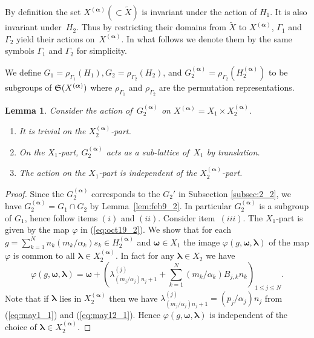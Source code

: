 \documentclass[11pt]{article}
\newtheorem{lemma}{Lemma}
\newcommand\bom{\boldsymbol{\omega}}
\newcommand\bol{\boldsymbol{\lambda}}
\newcommand\boa{\boldsymbol{\alpha}}
\begin{document}
By def\/inition the set $X^{(\boa)} (\subset \tilde{X})$ is invariant under the action of $H_1$.
It is also invariant under~$H_2$.
Thus by restricting their domains from $\tilde{X}$ to $X^{(\boa)}$, $\varGamma_1$ and $\varGamma_2$
yield their actions on~$X^{(\boa)}$.
In what follows we denote them by the same symbols $\varGamma_1$ and $\varGamma_2$
for simplicity.

We def\/ine
$G_1 = \rho_{\varGamma_1} (H_1), G_2 = \rho_{\varGamma_2} (H_2)$, and
$G_2^{(\boa)} = \rho_{\varGamma_2} (H_2^{(\boa)})$
to be subgroups of ${\frak S}(X^{(\boa)})$
where $\rho_{\varGamma_1}$ and $\rho_{\varGamma_2}$ are
the permutation representations.

\begin{lemma}\label{lem:oct19_1}
Consider the action of~$G_2^{(\boa)}$ on $X^{(\boa)}= X_1 \times X_2^{(\boa)}$.
\begin{enumerate}\itemsep=0pt
\item It is trivial on the $X_2^{(\boa)}$-part.
\item On the $X_1$-part, $G_2^{(\boa)}$ acts as a sub-lattice of~$X_1$ by translation.
\item The action on the $X_1$-part is independent of the $X_2^{(\boa)}$-part.
\end{enumerate}
\end{lemma}

\begin{proof}
Since the $G_2^{(\boa)}$ corresponds to the $G_2'$ in Subsection \ref{subsec:2_2}, we have
$G_2^{(\boa)} = G_1 \cap G_2$ by Lemma~\ref{lem:feb9_2}.
In particular $G_2^{(\boa)}$ is a subgroup of $G_1$, hence follow items $(i)$ and $(ii)$.
Consider item~$(iii)$.
The $X_1$-part is given by the map $\varphi$ in (\ref{eq:oct19_2}).
We show that
for each $g = \sum_{k=1}^N n_k (m_k/\alpha_k) s_k \in H_2^{(\boa)}$
and $\bom \in X_1$ the image $\varphi(g,\bom,\bol)$ of the map $\varphi$
is common to all $\bol \in X_2^{(\boa)}$.
In fact for any $\bol \in X_2$
we have
\begin{equation}\label{eq:may1_2}
\varphi(g,\bom,\bol) = \bom + \left(
\lambda^{(j)}_{(m_j/\alpha_j) n_j+1} + \sum_{k=1}^N (m_k/\alpha_k) B_{j,k} n_k
\right)_{1 \leq j \leq N}.
\end{equation}
Note that if $\bol$ lies in $X_2^{(\boa)}$ then we have $\lambda^{(j)}_{(m_j/\alpha_j) n_j+1} = (p_j/\alpha_j) n_j$ from
(\ref{eq:may1_1}) and (\ref{eq:may12_1}).
Hence
$\varphi(g,\bom,\bol)$ is independent of the choice of $\bol \in X_2^{(\boa)}$.
\end{proof}
\end{document}
